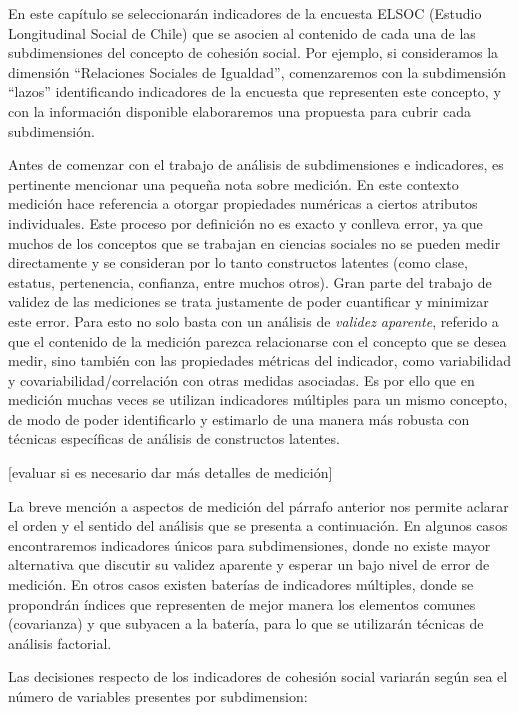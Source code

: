 \documentclass[
  12pt,
]{book}
\begin{document}
En este capítulo se seleccionarán indicadores de la encuesta ELSOC (Estudio Longitudinal Social de Chile) que se asocien al contenido de cada una de las subdimensiones del concepto de cohesión social. Por ejemplo, si consideramos la dimensión ``Relaciones Sociales de Igualdad'', comenzaremos con la subdimensión ``lazos'' identificando indicadores de la encuesta que representen este concepto, y con la información disponible elaboraremos una propuesta para cubrir cada subdimensión.

Antes de comenzar con el trabajo de análisis de subdimensiones e indicadores, es pertinente mencionar una pequeña nota sobre medición. En este contexto medición hace referencia a otorgar propiedades numéricas a ciertos atributos individuales. Este proceso por definición no es exacto y conlleva error, ya que muchos de los conceptos que se trabajan en ciencias sociales no se pueden medir directamente y se consideran por lo tanto constructos latentes (como clase, estatus, pertenencia, confianza, entre muchos otros). Gran parte del trabajo de validez de las mediciones se trata justamente de poder cuantificar y minimizar este error. Para esto no solo basta con un análisis de \emph{validez aparente}, referido a que el contenido de la medición parezca relacionarse con el concepto que se desea medir, sino también con las propiedades métricas del indicador, como variabilidad y covariabilidad/correlación con otras medidas asociadas. Es por ello que en medición muchas veces se utilizan indicadores múltiples para un mismo concepto, de modo de poder identificarlo y estimarlo de una manera más robusta con técnicas específicas de análisis de constructos latentes.

{[}evaluar si es necesario dar más detalles de medición{]}

La breve mención a aspectos de medición del párrafo anterior nos permite aclarar el orden y el sentido del análisis que se presenta a continuación. En algunos casos encontraremos indicadores únicos para subdimensiones, donde no existe mayor alternativa que discutir su validez aparente y esperar un bajo nivel de error de medición. En otros casos existen baterías de indicadores múltiples, donde se propondrán índices que representen de mejor manera los elementos comunes (covarianza) y que subyacen a la batería, para lo que se utilizarán técnicas de análisis factorial.

Las decisiones respecto de los indicadores de cohesión social variarán según sea el número de variables presentes por subdimension:
\end{document}

